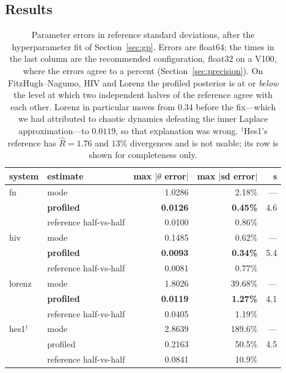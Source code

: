 \documentclass[11pt]{article}
\newcommand{\Rhat}{\widehat{R}}
\theoremstyle{plain}
\theoremstyle{definition}
\theoremstyle{remark}
\begin{document}
\subsection{Results}
\label{sec:results}

\begin{table}[t]
\centering\small
\begin{tabular}{llrrr}
\toprule
system & estimate & max $|\theta$ error$|$ & max $|$sd error$|$ & s\\
\midrule
fn & mode                    & 1.0286 & 2.18\% & ---\\
   & \textbf{profiled}       & \textbf{0.0126} & \textbf{0.45\%} & 4.6\\
   & reference half-vs-half  & 0.0100 & 0.86\% & \\
\midrule
hiv & mode                   & 0.1485 & 0.62\% & ---\\
   & \textbf{profiled}       & \textbf{0.0093} & \textbf{0.34\%} & 5.4\\
   & reference half-vs-half  & 0.0081 & 0.77\% & \\
\midrule
lorenz & mode                & 1.8026 & 39.68\% & ---\\
   & \textbf{profiled}       & \textbf{0.0119} & \textbf{1.27\%} & 4.1\\
   & reference half-vs-half  & 0.0405 & 1.19\% & \\
\midrule
hes1$^\dagger$ & mode        & 2.8639 & 189.6\% & ---\\
   & profiled                & 0.2163 & 50.5\% & 4.5\\
   & reference half-vs-half  & 0.0841 & 10.9\% & \\
\bottomrule
\end{tabular}
\caption{Parameter errors in reference standard deviations, after the hyperparameter fit of
Section~\ref{sec:gp}. Errors are float64; the times in the last column are the recommended
configuration, float32 on a V100, where the errors agree to a percent (Section~\ref{sec:precision}). On FitzHugh--Nagumo, HIV and Lorenz the profiled posterior is at or
\emph{below} the level at which two independent halves of the reference agree with each other.
Lorenz in particular moves from $0.34$ before the fix---which we had attributed to chaotic dynamics
defeating the inner Laplace approximation---to $0.0119$, so that explanation was wrong.
$^\dagger$Hes1's reference has $\Rhat = 1.76$ and $13\%$ divergences and is not usable; its row is
shown for completeness only.}
\label{tab:results}
\end{table}
\end{document}
